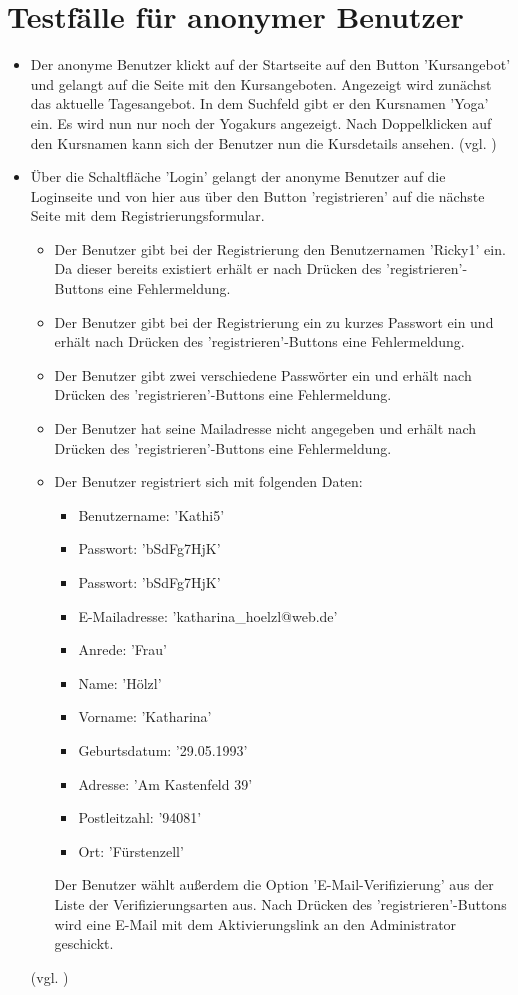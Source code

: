 \documentclass[a4paper]{scrreprt}
\newcounter{Lc}
\newcounter{Hc}
\newcommand{\stepHc}{\stepcounter{Hc}\setcounter{Lc}{0}}
\begin{document}
			
	\section{Testfälle für anonymer Benutzer}
			\stepHc
			\begin{itemize}
				\item {} 
				 Der anonyme Benutzer klickt auf der Startseite auf den Button 'Kursangebot'	und gelangt auf die Seite mit den Kursangeboten. Angezeigt wird zunächst das aktuelle Tagesangebot. In dem Suchfeld gibt er den Kursnamen 'Yoga' ein. Es wird nun nur noch der Yogakurs angezeigt. Nach Doppelklicken auf den Kursnamen kann sich der Benutzer nun die Kursdetails ansehen. (vgl. )
				
				\item {} 
				 Über die Schaltfläche 'Login' gelangt der anonyme Benutzer auf die Loginseite und von hier aus über den Button 'registrieren' auf die nächste Seite mit dem Registrierungsformular. 		
					\begin{itemize}
						\item Der Benutzer gibt bei der Registrierung den Benutzernamen 'Ricky1' ein. Da dieser bereits existiert erhält er nach Drücken des 'registrieren'-Buttons eine Fehlermeldung.	
						\item Der Benutzer gibt bei der Registrierung ein zu kurzes Passwort ein und erhält nach Drücken des 	'registrieren'-Buttons eine Fehlermeldung.	
						\item Der Benutzer gibt zwei verschiedene Passwörter ein und erhält nach Drücken des 'registrieren'-Buttons eine Fehlermeldung.
						\item Der Benutzer hat seine Mailadresse nicht angegeben und erhält nach Drücken des 'registrieren'-Buttons eine Fehlermeldung.	
						\item Der Benutzer registriert sich mit folgenden Daten: 
							\begin{itemize}
								\item Benutzername: 'Kathi5'
								\item Passwort: 'bSdFg7HjK'
								\item Passwort: 'bSdFg7HjK'
								\item E-Mailadresse: 'katharina\_hoelzl@web.de'
								\item Anrede: 'Frau'
								\item Name: 'Hölzl'
								\item Vorname: 'Katharina'
								\item Geburtsdatum: '29.05.1993'
								\item Adresse: 'Am Kastenfeld 39'
								\item Postleitzahl: '94081'
								\item Ort: 'Fürstenzell'
							\end{itemize}
						Der Benutzer wählt außerdem die Option 'E-Mail-Verifizierung' aus der Liste der Verifizierungsarten aus. Nach Drücken des 'registrieren'-Buttons wird eine E-Mail mit dem Aktivierungslink an den Administrator geschickt.
					\end{itemize}
				(vgl. )
			\end{itemize}	
		
\end{document}
